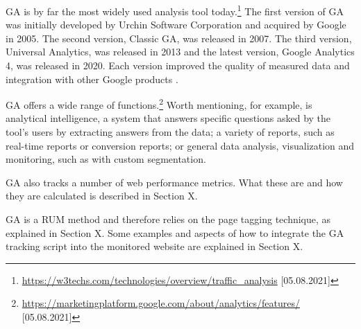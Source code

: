 
GA is by far the most widely used analysis tool today.\footnote{\url{https://w3techs.com/technologies/overview/traffic_analysis} [05.08.2021]}
The first version of GA was initially developed by Urchin Software Corporation and acquired by Google in 2005.
The second version, Classic GA, was released in 2007.
The third version, Universal Analytics, was released in 2013 and the latest version, Google Analytics 4, was released in 2020.
Each version improved the quality of measured data and integration with other Google products \cite{2021Franco}.


GA offers a wide range of functions.\footnote{\url{https://marketingplatform.google.com/about/analytics/features/} [05.08.2021]}
Worth mentioning, for example, is analytical intelligence, a system that answers specific questions asked by the tool's users by extracting answers from the data;
a variety of reports, such as real-time reports or conversion reports;
or general data analysis, visualization and monitoring, such as with custom segmentation.

GA also tracks a number of web performance metrics.
What these are and how they are calculated is described in Section X.


GA is a RUM method and therefore relies on the page tagging technique, as explained in Section X.
Some examples and aspects of how to integrate the GA tracking script into the monitored website are explained in Section X.










